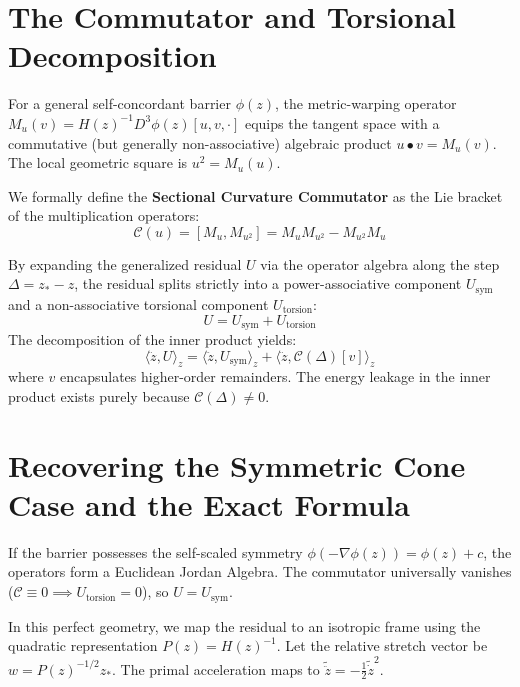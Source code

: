\documentclass[11pt]{article}
\begin{document}
\section{The Commutator and Torsional Decomposition}
For a general self-concordant barrier $\phi(z)$, the metric-warping operator $M_u(v) = H(z)^{-1} D^3\phi(z)[u, v, \cdot]$ equips the tangent space with a commutative (but generally non-associative) algebraic product $u \bullet v = M_u(v)$. The local geometric square is $u^2 = M_u(u)$. 

We formally define the \textbf{Sectional Curvature Commutator} as the Lie bracket of the multiplication operators:
\begin{equation}
    \mathcal{C}(u) = [M_u, M_{u^2}] = M_u M_{u^2} - M_{u^2} M_u
\end{equation}

By expanding the generalized residual $U$ via the operator algebra along the step $\Delta = z_* - z$, the residual splits strictly into a power-associative component $U_{\mathrm{sym}}$ and a non-associative torsional component $U_{\mathrm{torsion}}$:
\begin{equation}
    U = U_{\mathrm{sym}} + U_{\mathrm{torsion}}
\end{equation}
The decomposition of the inner product yields:
\begin{equation}
    \langle \ddot{z}, U \rangle_z = \langle \ddot{z}, U_{\mathrm{sym}} \rangle_z + \langle \ddot{z}, \mathcal{C}(\Delta)[v] \rangle_z
\end{equation}
where $v$ encapsulates higher-order remainders. The energy leakage in the inner product exists purely because $\mathcal{C}(\Delta) \neq 0$.

\section{Recovering the Symmetric Cone Case and the Exact Formula}
If the barrier possesses the self-scaled symmetry $\phi(-\nabla \phi(z)) = \phi(z) + c$, the operators form a Euclidean Jordan Algebra. The commutator universally vanishes ($\mathcal{C} \equiv 0 \implies U_{\mathrm{torsion}} = 0$), so $U = U_{\mathrm{sym}}$.

In this perfect geometry, we map the residual to an isotropic frame using the quadratic representation $P(z) = H(z)^{-1}$. Let the relative stretch vector be $w = P(z)^{-1/2} z_*$. The primal acceleration maps to $\tilde{\ddot{z}} = -\frac{1}{2}\tilde{\dot{z}}^2$.
\end{document}
